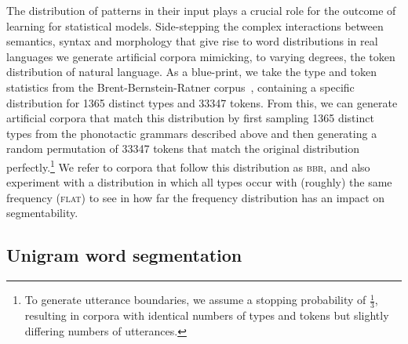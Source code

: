 \documentclass[11pt]{article}
\begin{document}
The distribution of patterns in their input plays a crucial role for the outcome of learning for statistical models. Side-stepping the complex interactions between semantics, syntax and morphology that give rise to word distributions in real languages we generate artificial corpora mimicking, to varying degrees, the token distribution of natural language. As a blue-print, we take the type and token statistics from the Brent-Bernstein-Ratner corpus~\cite{Brent99a}, containing a specific distribution for 1365 distinct types and 33347 tokens. From this, we can generate artificial corpora that match this distribution by first sampling 1365 distinct types from the phonotactic grammars described above and then generating a random permutation of 33347 tokens that match the original distribution perfectly.\footnote{To generate utterance boundaries, we assume a stopping probability of $\frac{1}{3}$, resulting in corpora with identical numbers of types and tokens but slightly differing numbers of utterances.} We refer to corpora that follow this distribution as \textsc{bbr}, and also experiment with a distribution in which all types occur with (roughly) the same frequency (\textsc{flat}) to see in how far the frequency distribution has an impact on segmentability.%

\subsection{Unigram word segmentation}
\end{document}
